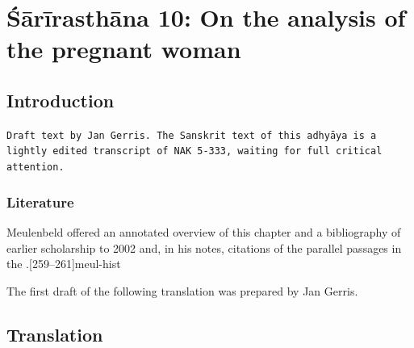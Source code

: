 
\chapter{Śārīrasthāna 10:  On the analysis of the pregnant woman}


\section{Introduction}

\texttt{Draft text by Jan Gerris.
The Sanskrit text of this adhyāya is a lightly edited transcript of NAK 5-333,
waiting for full critical attention.}

\subsection{Literature}

Meulenbeld offered an annotated overview of this chapter and a
bibliography of earlier scholarship to 2002 and, in his notes, citations
of the parallel passages in the \CS.[259--261]{meul-hist}   

The first draft of the following translation was prepared by Jan
Gerris.

    
    
\section{Translation}

